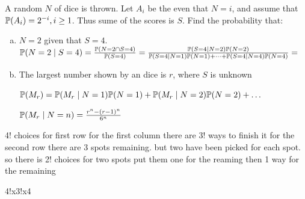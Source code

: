 \begin{example}
    A random $N$ of dice is thrown. Let $A_i$ be the even that $N=i$, and assume that $\P(A_i)=2^{-i}, i \geq 1$.
    Thus sume of the scores is $S$. Find the probability that:
    \begin{enumerate}[a.]
        \item $N = 2$ given that $S=4$.
        $\P(N=2 \mid S=4)=\frac{\P(N=2 \cap S=4)}{\P(S=4)}=\frac{\P(S=4\mid N=2)\P(N=2)}{\P(S=4 \mid N=1)\P(N=1)+\dots+\P(S=4 \mid N=4)\P(N=4)}
        =\frac{}{}$
        \item The largest number shown by an dice is $r$, where $S$ is unknown
        
        $\P(M_r)=\P(M_r\mid N=1)\P(N=1)+\P(M_r \mid N=2)\P(N=2)+\dots$

        $\P(M_r \mid N =n)=\frac{r^n - (r-1)^n}{6^n}$
    \end{enumerate}
\end{example}
4! choices for first row 
for the first column there are 3! ways to finish it
for the second row there are 3 spots remaining. but two have been picked for each spot. so there is 2! choices for two spots put them one for the reaming
then 1 way for the remaining

4!x3!x4
